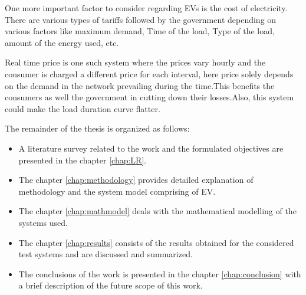 	\noindent One more important factor to consider regarding EVs is the cost of electricity. There are various types of tariffs followed by the government depending on various factors like maximum demand, Time of the load, Type of the load, amount of the energy used, etc. 
	
	\noindent Real time price is one such system where the prices vary hourly and the consumer is charged a different price for each interval, here price solely depends on the demand in the network prevailing during the time.This benefits the consumers as well the government in cutting down their losses.Also, this system could make the load duration curve flatter.


	\par The remainder of the thesis is organized as follows:
	\begin{itemize}
		\item A literature survey related to the work and the formulated objectives are presented in the chapter \ref{chap:LR}.
		
		\item The chapter \ref{chap:methodology}  provides detailed explanation
		of methodology and the system model comprising of EV.
				
		\item The chapter \ref{chap:mathmodel} deals with the mathematical modelling of the systems used.
		
		\item The chapter  \ref{chap:results} consists of the results obtained for the considered test systems and are discussed and summarized. 
		\item The conclusions of the work is presented in the chapter \ref{chap:conclusion} with a brief description of the future scope of this work.
	\end{itemize}
